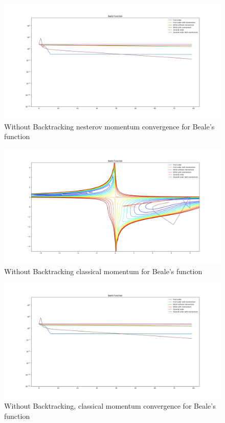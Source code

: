 \documentclass{article}
\begin{document}
\begin{figure}[H]
	\includegraphics[width=\linewidth]{../Images/baelenesterov1.png}
	\caption{Without Backtracking nesterov momentum convergence for Beale's function}
	\label{fig:Without Backtracking nesterov momentum convergence for Beale's function}
\end{figure}

\begin{figure}[H]
	\includegraphics[width=\linewidth]{../Images/baelemomentum.png}
	\caption{Without Backtracking classical momentum for Beale's function}
	\label{fig:Without Backtracking classical momentum for Beale's function}
\end{figure}

\begin{figure}[H]
	\includegraphics[width=\linewidth]{../Images/baelemomentum1.png}
	\caption{Without Backtracking, classical momentum convergence for Beale's function}
	\label{fig:Without Backtracking, classical momentum convergence for Beale's function}
\end{figure}
\end{document}
